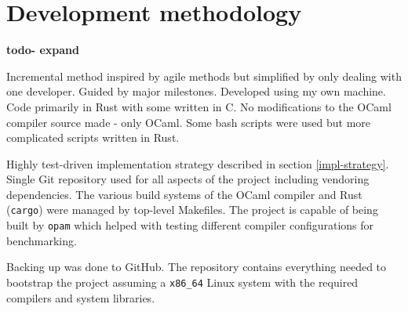 \section{Development methodology}

\textbf{todo- expand}

Incremental method inspired by agile methods but simplified by only dealing with one developer.
Guided by major milestones.  Developed using my own machine. Code primarily in Rust with some
written in C. No modifications to the OCaml compiler source made - only OCaml. Some bash scripts
were used but more complicated scripts written in Rust.

Highly test-driven implementation strategy described in section \ref{impl-strategy}. Single Git
repository used for all aspects of the project including vendoring dependencies. The various build
systems of the OCaml compiler and Rust (\texttt{cargo}) were managed by top-level Makefiles. The
project is capable of being built by \texttt{opam} which helped with testing different compiler
configurations for benchmarking.

Backing up was done to GitHub. The repository contains everything needed to bootstrap the project
assuming a \texttt{x86\_64} Linux system with the required compilers and system libraries.